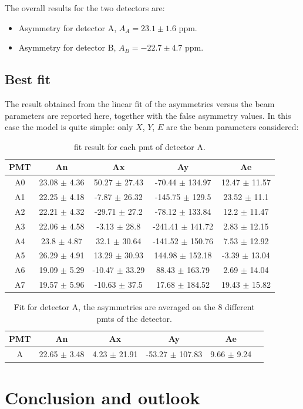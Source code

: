 The overall results for the two detectors are: 
\begin{itemize}
\item Asymmetry for detector A, $A_{A} =  23.1 \pm 1.6$ ppm.
\item Asymmetry for detector B, $A_{B} = -22.7 \pm 4.7$ ppm.
\end{itemize}


\section{Best fit}
The result obtained from the linear fit of the asymmetries versus the beam parameters are reported here, together with the false asymmetry values. In this case the model is quite simple: only $X$, $Y$, $E$ are the beam parameters considered:

\begin{table}[h] \label{Tab:FitResult}
\centering
\begin{tabular}{|c|c|c|c|c|}
\hline
 PMT   & An             & Ax              & Ay                 & Ae              \\
\hline
 A0    & 23.08 $\pm$ 4.36 & 50.27 $\pm$ 27.43  & -70.44 $\pm$ 134.97  & 12.47 $\pm$ 11.57 \\
 A1    & 22.25 $\pm$ 4.18 & -7.87 $\pm$ 26.32  & -145.75 $\pm$ 129.5  & 23.52 $\pm$ 11.1  \\
 A2    & 22.21 $\pm$ 4.32 & -29.71 $\pm$ 27.2  & -78.12 $\pm$ 133.84  & 12.2 $\pm$ 11.47  \\
 A3    & 22.06 $\pm$ 4.58 & -3.13 $\pm$ 28.8   & -241.41 $\pm$ 141.72 & 2.83 $\pm$ 12.15  \\
 A4    & 23.8 $\pm$ 4.87  & 32.1 $\pm$ 30.64   & -141.52 $\pm$ 150.76 & 7.53 $\pm$ 12.92  \\
 A5    & 26.29 $\pm$ 4.91 & 13.29 $\pm$ 30.93  & 144.98 $\pm$ 152.18  & -3.39 $\pm$ 13.04 \\
 A6    & 19.09 $\pm$ 5.29 & -10.47 $\pm$ 33.29 & 88.43 $\pm$ 163.79   & 2.69 $\pm$ 14.04  \\
 A7    & 19.57 $\pm$ 5.96 & -10.63 $\pm$ 37.5  & 17.68 $\pm$ 184.52   & 19.43 $\pm$ 15.82 \\
\hline
\end{tabular}
\caption{fit result for each pmt of detector A.}
\end{table}

\begin{table}
\centering
\begin{tabular}{c|c|c|c|c|c}
\hline
 PMT   & An             & Ax             & Ay                & Ae            \\
\hline
 A     & 22.65 $\pm$ 3.48 & 4.23 $\pm$ 21.91 & -53.27 $\pm$ 107.83 & 9.66 $\pm$ 9.24 \\
\hline
\end{tabular}
\caption{Fit for detector A, the asymmetries are averaged on the 8 different pmts of the detector.}
\end{table}

\chapter{Conclusion and outlook} \label{conclusion}

